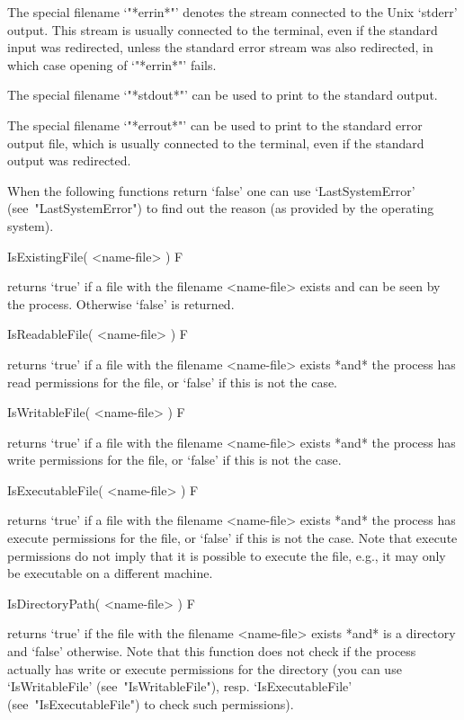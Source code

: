 The  special filename `"*errin*"' denotes   the stream connected  to  the
Unix `stderr' output.  This stream is usually connected  to the terminal, even
if  the standard input was  redirected, unless the  standard error stream
was also redirected, in which case opening of `"*errin*"' fails.
    
The special filename `"*stdout*"'  can be used to  print to  the standard
output.

The special  filename `"*errout*"' can be  used to  print to the standard
error output file, which is usually  connected  to  the terminal, even if
the standard output was redirected.
    

When the following functions return `false' one can use `LastSystemError'
(see~"LastSystemError") to find  out  the  reason  (as  provided  by  the
operating system).

\>IsExistingFile( <name-file> ) F

returns `true' if a file with the filename <name-file> exists and can be
seen by the {\GAP} process. Otherwise `false' is returned.

\>IsReadableFile( <name-file> ) F

returns `true' if a file with the filename <name-file> exists  *and*  the
{\GAP} process has read permissions for the file, or `false' if 
this is not the case.

\>IsWritableFile( <name-file> ) F

returns `true' if a file with the filename <name-file> exists  *and*  the
{\GAP} process has write permissions for  the  file,  or  `false'  if  
this is not the case.

\>IsExecutableFile( <name-file> ) F

returns `true'  if a  file with  the filename  <name-file> exists  *and* the
{\GAP} process has  execute permissions for the file, or  `false' if this is
not the case. Note that execute permissions do not imply that it is possible
to execute the file, e.g., it may only be executable on a different machine.

\>IsDirectoryPath( <name-file> ) F

returns `true' if the file with the filename <name-file> exists *and*  is
a directory and  `false' otherwise.
Note that this function does not check if the {\GAP} process actually has
write  or  execute  permissions  for   the   directory   (you   can   use
`IsWritableFile'   (see~"IsWritableFile"),    resp.    `IsExecutableFile'
(see~"IsExecutableFile") to check such permissions).

